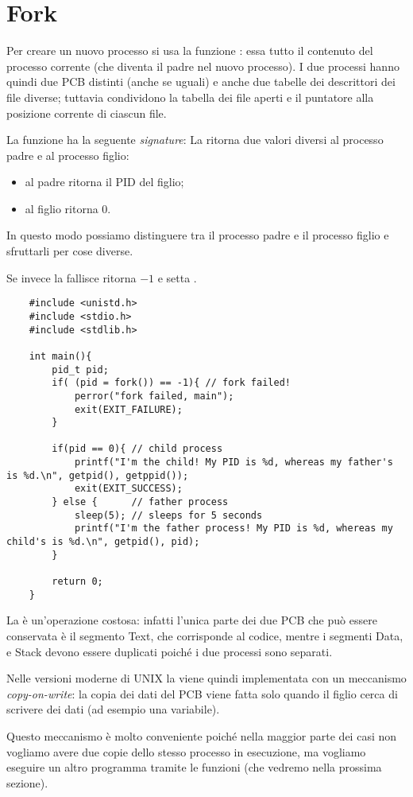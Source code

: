\section{Fork}

Per creare un nuovo processo si usa la funzione : essa  tutto il contenuto del processo corrente (che diventa il padre nel nuovo processo). I due processi hanno quindi due \textsf{PCB} distinti (anche se uguali) e anche due tabelle dei descrittori dei file diverse; tuttavia condividono la tabella dei file aperti e il puntatore alla posizione corrente di ciascun file.

La funzione  ha la seguente \emph{signature}:
La  ritorna due valori diversi al processo padre e al processo figlio: 
\begin{itemize}
    \item al padre ritorna il \textsf{PID} del figlio;
    \item al figlio ritorna $0$.
\end{itemize} In questo modo possiamo distinguere tra il processo padre e il processo figlio e sfruttarli per cose diverse.

Se invece la  fallisce ritorna $-1$ e setta . 

\begin{verbatim}
    #include <unistd.h>
    #include <stdio.h>
    #include <stdlib.h>

    int main(){
        pid_t pid;
        if( (pid = fork()) == -1){ // fork failed!
            perror("fork failed, main");
            exit(EXIT_FAILURE);
        }

        if(pid == 0){ // child process
            printf("I'm the child! My PID is %d, whereas my father's is %d.\n", getpid(), getppid());
            exit(EXIT_SUCCESS);
        } else {      // father process
            sleep(5); // sleeps for 5 seconds
            printf("I'm the father process! My PID is %d, whereas my child's is %d.\n", getpid(), pid);
        }
    
        return 0;
    }
\end{verbatim}

La  è un'operazione costosa: 
infatti l'unica parte dei due \textsf{PCB} che può essere conservata è il segmento \textsf{Text}, che corrisponde al codice, 
mentre i segmenti \textsf{Data},  e \textsf{Stack} devono essere duplicati poiché i due processi sono separati.

Nelle versioni moderne di UNIX la  viene quindi implementata con un meccanismo \emph{copy-on-write}: la copia dei dati del \textsf{PCB} viene fatta solo quando il figlio cerca di scrivere dei dati (ad esempio una variabile).

Questo meccanismo è molto conveniente poiché nella maggior parte dei casi non vogliamo avere due copie dello stesso processo in esecuzione, ma vogliamo eseguire un altro programma tramite le funzioni  (che vedremo nella prossima sezione).